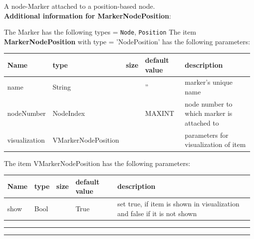 \label{sec:item:MarkerNodePosition}
A node-Marker attached to a position-based node.\vspace{12pt}
 \\{\bf Additional information for MarkerNodePosition}:
\bi
  \item The Marker has the following types = \texttt{Node}, \texttt{Position}
\ei
\vspace{12pt} \noindent The item {\bf MarkerNodePosition} with type = 'NodePosition' has the following parameters:\vspace{-1cm}\\ 
\begin{center}
  \footnotesize
  \begin{longtable}{| p{4.5cm} | p{2.5cm} | p{0.5cm} | p{2.5cm} | p{6cm} |}
    \hline
    \bf Name & \bf type & \bf size & \bf default value & \bf description \\ \hline
    name &     String &      &     '' &     marker's unique name\\ \hline
    nodeNumber &     NodeIndex &      &     MAXINT &     node number to which marker is attached to\\ \hline
    visualization & VMarkerNodePosition & & & parameters for visualization of item \\ \hline
	  \end{longtable}
	\end{center}
The item VMarkerNodePosition has the following parameters:\vspace{-1cm}\\ 
\begin{center}
  \footnotesize
  \begin{longtable}{| p{4.5cm} | p{2.5cm} | p{0.5cm} | p{2.5cm} | p{6cm} |}
    \hline
    \bf Name & \bf type & \bf size & \bf default value & \bf description \\ \hline
    show &     Bool &      &     True &     set true, if item is shown in visualization and false if it is not shown\\ \hline
	  \end{longtable}
	\end{center}
\par\noindent\rule{\textwidth}{0.4pt}
\label{description_MarkerNodePosition}
\vspace{6pt}\par\noindent\rule{\textwidth}{0.4pt}

